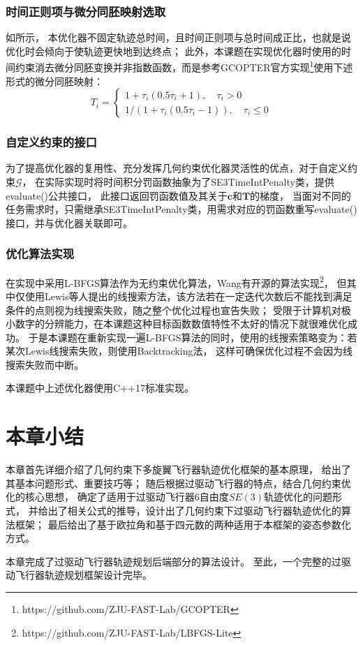 \subsubsection{时间正则项与微分同胚映射选取}
如所示， 
本优化器不固定轨迹总时间，且时间正则项与总时间成正比，也就是说优化时会倾向于使轨迹更快地到达终点；
此外，本课题在实现优化器时使用的时间约束消去微分同胚变换并非指数函数，而是参考GCOPTER官方实现\footnote{https://github.com/ZJU-FAST-Lab/GCOPTER}使用下述形式的微分同胚映射：
\begin{equation}
  T_i = 
  \begin{cases}
    1 + \tau_i(0.5\tau_i + 1), \quad \tau_i > 0 \\
    {1}/(1 + \tau_i(0.5\tau_i - 1)), \quad \tau_i \leq 0
  \end{cases}
  \label{equ:the_actual_diffeomorphism_used}
\end{equation}

\subsubsection{自定义约束的接口}
为了提高优化器的复用性、充分发挥几何约束优化器灵活性的优点，对于自定义约束$\mathcal{G}$，
在实际实现时将时间积分罚函数抽象为了SE3TimeIntPenalty类，提供evaluate()公共接口，
此接口返回罚函数值及其关于$\bm{c}$和$\bm{T}$的梯度，
当面对不同的任务需求时，只需继承SE3TimeIntPenalty类，用需求对应的罚函数重写evaluate()接口，并与优化器关联即可。

\subsubsection{优化算法实现}
在实现中采用L-BFGS算法\cite{liu1989limited}作为无约束优化算法，Wang有开源的算法实现\footnote{https://github.com/ZJU-FAST-Lab/LBFGS-Lite}，
但其中仅使用Lewis等人提出的线搜索方法\cite{lewis2013nonsmooth}，该方法若在一定迭代次数后不能找到满足条件的点则视为线搜索失败，随之整个优化过程也宣告失败；
受限于计算机对极小数字的分辨能力，在本课题这种目标函数数值特性不太好的情况下就很难优化成功。
于是本课题在重新实现一遍L-BFGS算法的同时，使用的线搜索策略变为：若某次Lewis线搜索失败，则使用Backtracking法，
这样可确保优化过程不会因为线搜索失败而中断。

本课题中上述优化器使用C++17标准实现。

\section{本章小结}\label{sec:summary_4}
本章首先详细介绍了几何约束下多旋翼飞行器轨迹优化框架的基本原理，
给出了其基本问题形式、重要技巧等；
随后根据过驱动飞行器的特点，结合几何约束优化的核心思想，
确定了适用于过驱动飞行器6自由度$SE(3)$轨迹优化的问题形式，
并给出了相关公式的推导，设计出了几何约束下过驱动飞行器轨迹优化的算法框架；
最后给出了基于欧拉角和基于四元数的两种适用于本框架的姿态参数化方式。

本章完成了过驱动飞行器轨迹规划后端部分的算法设计。
至此，一个完整的过驱动飞行器轨迹规划框架设计完毕。

